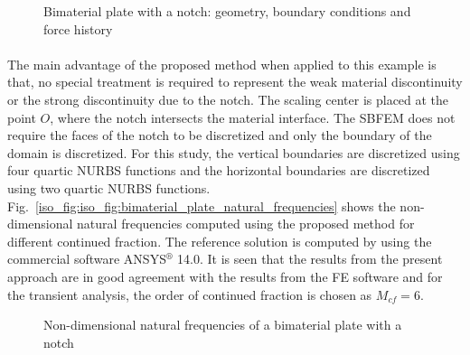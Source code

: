 \begin{figure}[h!]
\begin{subfigure}[b]{0.5\linewidth}
{            }
        \end{subfigure}
        \caption{Bimaterial plate with a notch: geometry, boundary conditions and force history}
        \label{iso_fig:bimaterial_plate_geo_bc}
    \end{figure}

\paragraph{}
The main advantage of the proposed method when applied to this example is that, no special treatment is required to represent the weak material discontinuity or the strong discontinuity due to the notch.
The scaling center is placed at the point $O$, where the notch intersects the material interface.
The SBFEM does not require the faces of the notch to be discretized and only the boundary of the domain is discretized.
For this study, the vertical boundaries are discretized using four quartic NURBS functions and the horizontal boundaries are discretized using two quartic
NURBS functions.
Fig.~\ref{iso_fig:iso_fig:bimaterial_plate_natural_frequencies} shows the non-dimensional natural frequencies computed using the proposed method for different continued fraction. The reference solution is computed by using the commercial software ANSYS$^\circledR$ 14.0.
It is seen that the results from the present approach are in good agreement with the results from the FE software and for the transient analysis, the order of continued fraction is chosen as $M_{cf} = 6$.
    \begin{figure}[h!]
        \centering
        \caption{Non-dimensional natural frequencies of a bimaterial plate with a notch}
        \label{iso_fig:bimaterial_plate_natural_frequencies}
    \end{figure}

